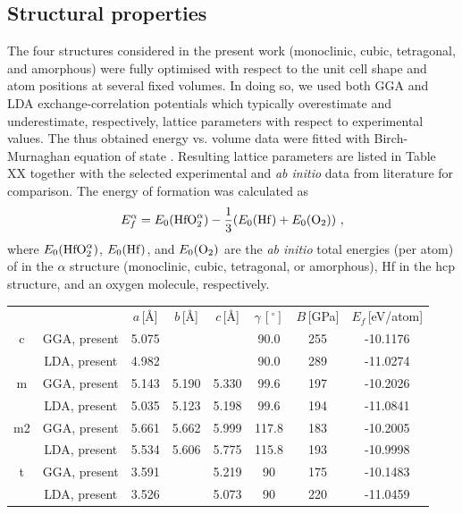 \documentclass[10pt,a4paper,twocolumn]{article}
\begin{document}
\subsection{Structural properties}

The four structures considered in the present work (monoclinic, cubic, tetragonal, and amorphous) were fully optimised with respect to the unit cell shape and atom positions at several fixed volumes.
In doing so, we used both GGA and LDA exchange-correlation potentials which typically overestimate and underestimate, respectively, lattice parameters with respect to experimental values.
The thus obtained energy vs. volume data were fitted with Birch-Murnaghan equation of state \cite{Birch1947}.
Resulting lattice parameters are listed in Table XX together with the selected experimental and \textit{ab initio} data from literature for comparison.
The energy of formation was calculated as
\begin{equation}
  E_f^\alpha=E_0(\ce{HfO2}^\alpha) - \frac13 (E_0(\ce{Hf}) + E_0(\ce{O2}))\ ,
\end{equation}
where $E_0(\ce{HfO2}^\alpha)$, $E_0(\ce{Hf})$, and $E_0(\ce{O2})$ are the \textit{ab initio} total energies (per atom) of  in the $\alpha$ structure (monoclinic, cubic, tetragonal, or amorphous), Hf in the hcp structure, and an oxygen molecule, respectively.


\begin{table}
\begin{center}
\begin{tabular}{cccccccc}

 & & $a$\,[\AA] & $b$\,[\AA] & $c$\,[\AA] & $\gamma\,[^{\circ}]$ & $B$\,[GPa] & $E_f$\,[eV/atom] \\
c & GGA, present & 5.075 & & & 90.0 & 255 & -10.1176 \\
  & LDA, present & 4.982 & & & 90.0 & 289 & -11.0274 \\

m & GGA, present & 5.143 & 5.190 & 5.330 & 99.6 & 197 & -10.2026 \\
  & LDA, present & 5.035 & 5.123 & 5.198 & 99.6 & 194 & -11.0841 \\

m2 & GGA, present & 5.661 & 5.662 & 5.999 & 117.8 & 183 & -10.2005 \\
   & LDA, present & 5.534 & 5.606 & 5.775 & 115.8 & 193 & -10.9998 \\

t & GGA, present & 3.591 & & 5.219 & 90 & 175 & -10.1483 \\
  &  LDA, present & 3.526 & & 5.073 & 90 & 220 & -11.0459 \\

\end{tabular}
\end{center}
\end{table}
\end{document}
